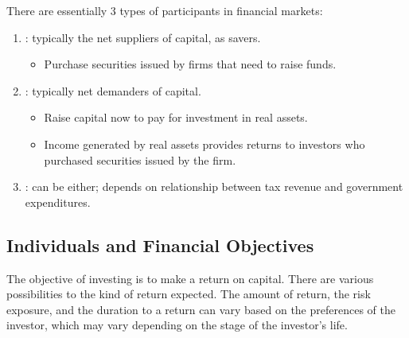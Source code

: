 \documentclass[notoc,notitlepage]{tufte-book}
\begin{document}
There are essentially 3 types of participants in financial markets:
\begin{enumerate}
  \item {}: typically the net suppliers of capital, as savers.
    \begin{itemize}
      \item Purchase securities issued by firms that need to raise funds.
    \end{itemize}
  \item {}: typically net demanders of capital.
    \begin{itemize}
      \item Raise capital now to pay for investment in real assets.
      \item Income generated by real assets provides returns to investors
        who purchased securities issued by the firm.
    \end{itemize}
  \item {}: can be either; depends on relationship between
    tax revenue and government expenditures.
\end{enumerate}

\subsection{Individuals and Financial Objectives}%
\label{sub:individuals_and_financial_objectives}

The objective of investing is to make a return on capital.
There are various possibilities to the kind of return expected.
The amount of return, the risk exposure, and the duration to a return
can vary based on the preferences of the investor,
which may vary depending on the stage of the investor's life.

\end{document}

